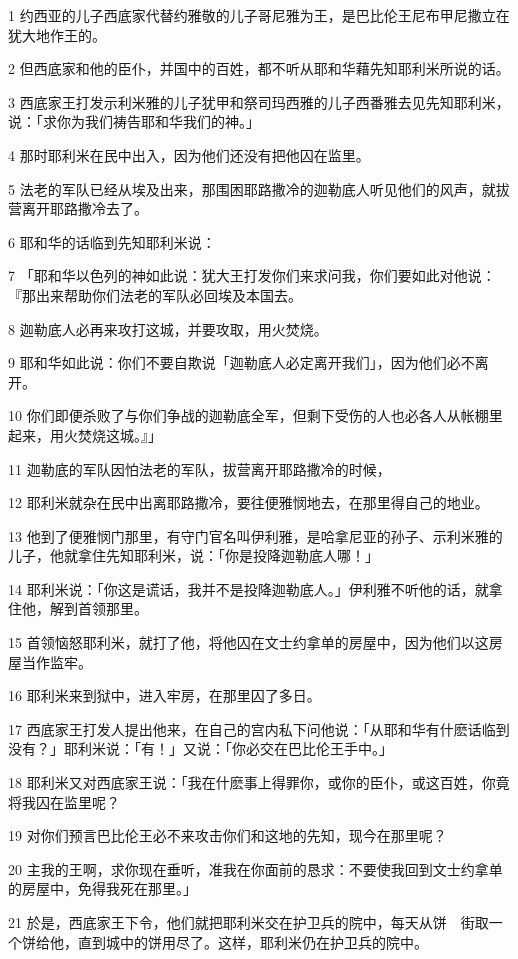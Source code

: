 \par 1 约西亚的儿子西底家代替约雅敬的儿子哥尼雅为王，是巴比伦王尼布甲尼撒立在犹大地作王的。
\par 2 但西底家和他的臣仆，并国中的百姓，都不听从耶和华藉先知耶利米所说的话。
\par 3 西底家王打发示利米雅的儿子犹甲和祭司玛西雅的儿子西番雅去见先知耶利米，说：「求你为我们祷告耶和华我们的神。」
\par 4 那时耶利米在民中出入，因为他们还没有把他囚在监里。
\par 5 法老的军队已经从埃及出来，那围困耶路撒冷的迦勒底人听见他们的风声，就拔营离开耶路撒冷去了。
\par 6 耶和华的话临到先知耶利米说：
\par 7 「耶和华以色列的神如此说：犹大王打发你们来求问我，你们要如此对他说：『那出来帮助你们法老的军队必回埃及本国去。
\par 8 迦勒底人必再来攻打这城，并要攻取，用火焚烧。
\par 9 耶和华如此说：你们不要自欺说「迦勒底人必定离开我们」，因为他们必不离开。
\par 10 你们即便杀败了与你们争战的迦勒底全军，但剩下受伤的人也必各人从帐棚里起来，用火焚烧这城。』」
\par 11 迦勒底的军队因怕法老的军队，拔营离开耶路撒冷的时候，
\par 12 耶利米就杂在民中出离耶路撒冷，要往便雅悯地去，在那里得自己的地业。
\par 13 他到了便雅悯门那里，有守门官名叫伊利雅，是哈拿尼亚的孙子、示利米雅的儿子，他就拿住先知耶利米，说：「你是投降迦勒底人哪！」
\par 14 耶利米说：「你这是谎话，我并不是投降迦勒底人。」伊利雅不听他的话，就拿住他，解到首领那里。
\par 15 首领恼怒耶利米，就打了他，将他囚在文士约拿单的房屋中，因为他们以这房屋当作监牢。
\par 16 耶利米来到狱中，进入牢房，在那里囚了多日。
\par 17 西底家王打发人提出他来，在自己的宫内私下问他说：「从耶和华有什麽话临到没有？」耶利米说：「有！」又说：「你必交在巴比伦王手中。」
\par 18 耶利米又对西底家王说：「我在什麽事上得罪你，或你的臣仆，或这百姓，你竟将我囚在监里呢？
\par 19 对你们预言巴比伦王必不来攻击你们和这地的先知，现今在那里呢？
\par 20 主我的王啊，求你现在垂听，准我在你面前的恳求：不要使我回到文士约拿单的房屋中，免得我死在那里。」
\par 21 於是，西底家王下令，他们就把耶利米交在护卫兵的院中，每天从饼　街取一个饼给他，直到城中的饼用尽了。这样，耶利米仍在护卫兵的院中。

